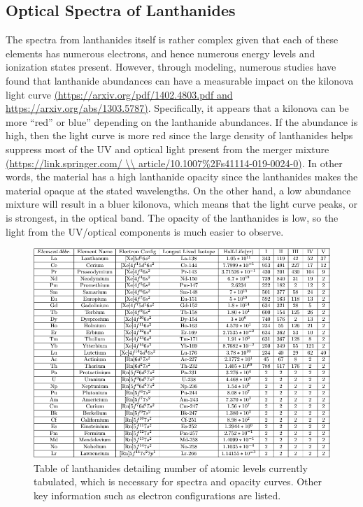 \documentclass[11pt,a4paper]{article}
\begin{document}
\subsection{Optical Spectra of Lanthanides}

The spectra from lanthanides itself is rather complex given that each of these elements has numerous electrons, and hence numerous energy levels and ionization states present. However, through modeling, numerous studies have found that lanthanide abundances can have a measurable impact on the kilonova light curve \url{(https://arxiv.org/pdf/1402.4803.pdf and https://arxiv.org/abs/1303.5787)}.
Specifically, it appears that a kilonova can be more “red” or blue” depending on the lanthanide abundances. If the abundance is high, then the light curve is more red since the large density of lanthanides helps suppress most of the UV and optical light present from the merger mixture \url{(https://link.springer.com/ \\ article/10.1007\%2Fs41114-019-0024-0)}. In other words, the material has a high lanthanide opacity since the lanthanides makes the material opaque at the stated wavelengths. On the other hand, a low abundance mixture will result in a bluer kilonova, which means that the light curve peaks, or is strongest, in the optical band. The opacity of the lanthanides is low, so the light from the UV/optical components is much easier to observe. 


\begin{figure}[h!]
  \includegraphics[width=1\textwidth]{level_pic.png}
  \caption{Table of lanthanides detailing number of atomic levels currently tabulated, which is necessary for spectra and opacity curves. Other key information such as electron configurations are listed. }
\end{figure}
\end{document}
